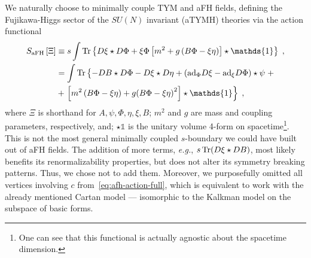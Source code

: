 \documentclass[../main.tex]{subfiles}
\begin{document}
We naturally choose to minimally couple TYM and aFH fields, defining the Fujikawa-Higgs sector of the $SU(N)$ invariant  (aTYMH) theories via the action functional
\begin{subequations}%
  \label{eq:afh-action}
  \begin{align}%
    S_{\text{aFH}} \left[ \Xi \right] & \equiv s \int \tr \left\{D \xi \star D \Phi + \xi \Phi \left[m^2 + g \left(B \Phi - \xi \eta\right)\right] \star \mathds{1} \right\} \;,                      \label{eq:afh-action-s-exact} \\
                                      & = \int \tr \left\{ -DB \star D \Phi - D \xi \star D \eta + \left( \mathrm{ad}_{\Phi}D \xi - \mathrm{ad}_{\xi} D \Phi \right) \star \psi \vphantom{m^2} \right. + \nonumber                  \\
                                      & + \left. \left[ m^2 \left( B \Phi - \xi \eta \right) + g {\left( B \Phi - \xi \eta \right)}^{2} \right] \star \mathds{1}  \right\} \;, \label{eq:afh-action-full}
  \end{align}
\end{subequations}
where $\Xi$ is shorthand for $A, \psi, \Phi, \eta, \xi, B$; $m^2$ and $g$ are mass and coupling parameters, respectively, and; $\star \mathds{1}$ is the unitary volume 4-form on spacetime\footnote{One can see that this functional is actually agnostic about the spacetime dimension.}. This is not the most general minimally coupled $s$-boundary we could have built out of aFH fields. The addition of more terms, \textit{e.g.}, $s \operatorname{Tr} (D \xi \star DB)$, most likely benefits its renormalizability properties, but does not alter its symmetry breaking patterns. Thus, we chose not to add them. Moreover, we purposefully omitted all vertices involving $c$ from~\eqref{eq:afh-action-full}, which is equivalent to work with the already mentioned Cartan model --- isomorphic to the Kalkman model on the subspace of basic forms.
\end{document}
